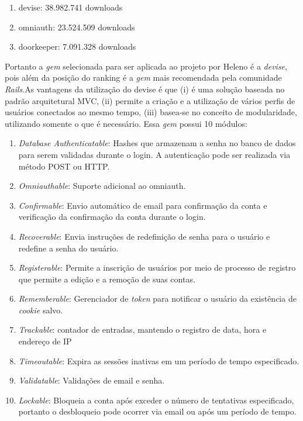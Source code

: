 \begin{enumerate}
	\item devise: 38.982.741 downloads
	\item omniauth: 23.524.509 downloads
	\item doorkeeper: 7.091.328 downloads
\end{enumerate}

Portanto a \textit{gem} selecionada para ser aplicada ao projeto por Heleno é a \textit{devise}, pois além da posição do ranking é a \textit{gem} mais recomendada pela comunidade \textit{Rails}.As vantagens da utilização do devise é que (i) é uma solução baseada no padrão arquitetural MVC, (ii) permite a criação e a utilização de vários perfis de usuários conectados ao mesmo tempo, (iii) basea-se no conceito de modularidade, utilizando somente o que é necessário. Essa \textit{gem} possui 10 módulos: 

\begin{enumerate}
	\item \textit{Database Authenticatable}: Hashes que armazenam a senha no banco de dados para serem validadas durante o login. A autenticação pode ser realizada via método POST ou HTTP. 
	\item \textit{Omniauthable}: Suporte adicional ao omniauth.
	\item \textit{Confirmable}: Envio automático de email para confirmação da conta e verificação da confirmação da conta durante o login.
	\item \textit{Recoverable}: Envia instruções de redefinição de senha para o usuário e redefine a senha do usuário.
	\item \textit{Registerable}: Permite a inscrição de usuários por meio de processo de registro que permite a edição e a remoção de suas contas.
	\item \textit{Rememberable}: Gerenciador de \textit{token} para notificar o usuário da existência de \textit{cookie} salvo.
	\item \textit{Trackable}: contador de entradas, mantendo o registro de data, hora e endereço de IP
	\item \textit{Timeoutable}: Expira as sessões inativas em um período de tempo especificado. 
	\item \textit{Validatable}: Validações de email e senha. 
	\item \textit{Lockable}: Bloqueia a conta após exceder o número de tentativas especificado, portanto o desbloqueio pode ocorrer via email ou após um período de tempo. 
\end{enumerate}

